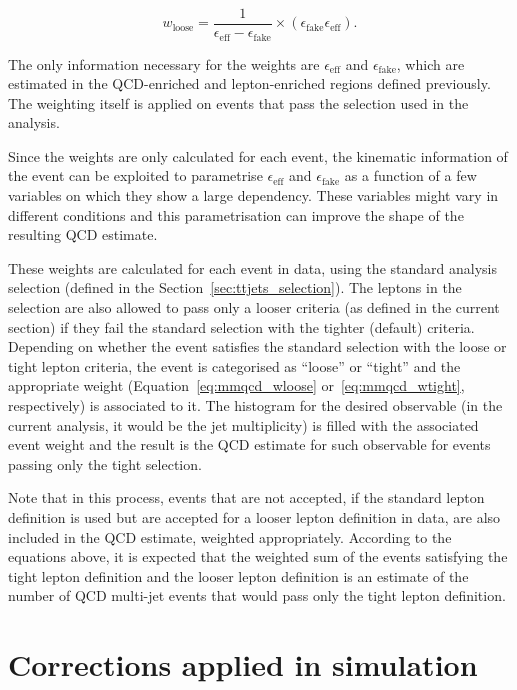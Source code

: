 \begin{equation}
\displaystyle
w_{\mathrm{loose}} = \frac{1}{\epsilon_{\mathrm{eff}} - \epsilon_{\mathrm{fake}}} \times ( \epsilon_{\mathrm{fake}} \epsilon_{\mathrm{eff}} ).
\label{eq:mmqcd_wloose}
\end{equation}

The only information necessary for the weights are $\epsilon_{\mathrm{eff}}$ and $\epsilon_{\mathrm{fake}}$, which are estimated
in the QCD-enriched and lepton-enriched regions defined previously. The weighting itself is applied on events that pass the
selection used in the analysis.

Since the weights are only calculated for each event, the kinematic information of the event can be exploited to parametrise
$\epsilon_{\mathrm{eff}}$ and $\epsilon_{\mathrm{fake}}$ as a function of a few variables on which they show a large dependency.
These variables might vary in different conditions and this parametrisation can improve the shape of the resulting QCD estimate.

These weights are calculated for each event
in data, using the standard analysis selection (defined
in the Section~\ref{sec:ttjets_selection}). The leptons in the selection
are also allowed to pass only a looser criteria (as defined in the current
section) if they fail the standard selection with the tighter (default)
criteria. Depending on whether the event satisfies the standard selection
with the loose or tight lepton criteria, the event is categorised as
``loose'' or ``tight'' and the appropriate weight (Equation~\ref{eq:mmqcd_wloose} or~\ref{eq:mmqcd_wtight}, respectively) is associated to it.
The histogram for the desired observable (in the current analysis,
it would be the jet multiplicity) is filled with the
associated event weight and the result is the QCD estimate for such
observable for events passing only the tight selection.

Note that
in this process, events that are not accepted, if the standard lepton
definition is used but are accepted for a looser lepton definition in data,
are also included in the QCD estimate, weighted appropriately.
According to the equations above, it is expected that the weighted sum
of the events satisfying the tight lepton definition and the looser
lepton definition is an estimate of the number of QCD multi-jet events
that would pass only the tight lepton definition.


\section{Corrections applied in simulation}
\label{sec:ttjets_corrections}

